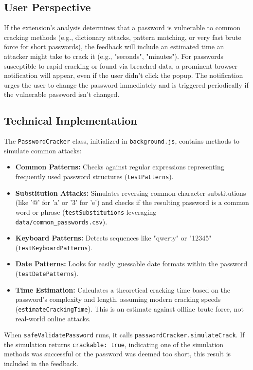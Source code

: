 \documentclass[11pt,oneside,a4paper]{book}
\begin{document}
\subsection{User Perspective}
If the extension's analysis determines that a password is vulnerable to common cracking methods (e.g., dictionary attacks, pattern matching, or very fast brute force for short passwords), the feedback will include an estimated time an attacker might take to crack it (e.g., "seconds", "minutes"). For passwords susceptible to rapid cracking or found via breached data, a prominent browser notification will appear, even if the user didn't click the popup. The notification urges the user to change the password immediately and is triggered periodically if the vulnerable password isn't changed.

\subsection{Technical Implementation}
The \texttt{PasswordCracker} class, initialized in \texttt{background.js}, contains methods to simulate common attacks:
\begin{itemize}
    \item \textbf{Common Patterns:} Checks against regular expressions representing frequently used password structures (\texttt{testPatterns}).
    \item \textbf{Substitution Attacks:} Simulates reversing common character substitutions (like '@' for 'a' or '3' for 'e') and checks if the resulting password is a common word or phrase (\texttt{testSubstitutions} leveraging \texttt{data/common\_passwords.csv}).
    \item \textbf{Keyboard Patterns:} Detects sequences like "qwerty" or "12345" (\texttt{testKeyboardPatterns}).
    \item \textbf{Date Patterns:} Looks for easily guessable date formats within the password\\ (\texttt{testDatePatterns}).
    \item \textbf{Time Estimation:} Calculates a theoretical cracking time based on the password's complexity and length, assuming modern cracking speeds (\texttt{estimateCrackingTime}). This is an estimate against offline brute force, not real-world online attacks.
\end{itemize}
When \texttt{safeValidatePassword} runs, it calls \texttt{passwordCracker.simulateCrack}. If the simulation returns \texttt{crackable: true}, indicating one of the simulation methods was successful or the password was deemed too short, this result is included in the feedback.
\end{document}
